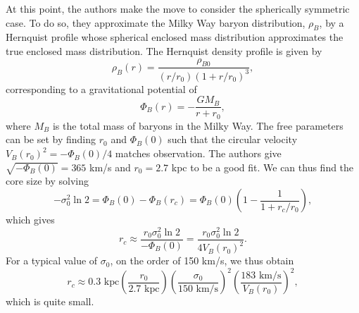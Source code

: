 At this point, the authors make the move to consider the spherically symmetric
case. To do so, they approximate the Milky Way baryon distribution, $\rho_B$, by
a Hernquist profile whose spherical enclosed mass distribution approximates
the true enclosed mass distribution. The Hernquist density profile is given by 
\begin{equation}
\rho_B(r) = \frac{\rho_{B0}}{(r/r_0) (1 + r/r_0)^3},
\end{equation}
corresponding to a gravitational potential of 
\begin{equation}
\Phi_B(r) = - \frac{G M_B}{r + r_0},
\end{equation}
where $M_B$ is the total mass of baryons in the Milky Way. The free parameters
can be set by finding $r_0$ and $\Phi_B(0)$ such that the circular velocity
$V_B(r_0)^2 = - \Phi_B(0) / 4$ matches observation. The authors give
$\sqrt{-\Phi_B(0)} = 365$ km/s and $r_0 = 2.7$ kpc to be a good fit. We can thus
find the core size by solving
\begin{equation}
-\sigma_0^2 \ln 2 = \Phi_B(0) - \Phi_B(r_c) = \Phi_B(0) \left(1 - \frac{1}{1 + r_c/r_0}\right),
\end{equation}
which gives 
\begin{equation}
r_c 
\approx \frac{r_0 \sigma_0^2 \ln 2}{-\Phi_B(0)} 
= \frac{r_0 \sigma_0^2 \ln 2}{4 V_B(r_0)^2}.
\end{equation}
For a typical value of $\sigma_0$, on the order of 150 km/s, we thus obtain 
\begin{equation}
r_c \approx 0.3 \text{ kpc} 
\left(\frac{r_0}{2.7 \text{ kpc}}\right)
\left(\frac{\sigma_0}{150 \text{ km/s}}\right)^2
\left(\frac{183 \text{ km/s}}{V_B(r_0)}\right)^2,
\end{equation}
which is quite small.

